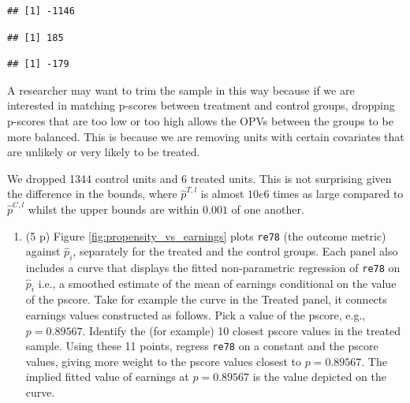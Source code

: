 \documentclass[
]{article}
\newenvironment{Shaded}{\begin{snugshade}}{\end{snugshade}}
\newcommand{\DecValTok}[1]{\textcolor[rgb]{0.00,0.00,0.81}{#1}}
\newcommand{\FunctionTok}[1]{\textcolor[rgb]{0.13,0.29,0.53}{\textbf{#1}}}
\newcommand{\NormalTok}[1]{#1}
\newcommand{\SpecialCharTok}[1]{\textcolor[rgb]{0.81,0.36,0.00}{\textbf{#1}}}
\providecommand{\tightlist}{%
  \setlength{\itemsep}{0pt}\setlength{\parskip}{0pt}}
\begin{document}
\begin{verbatim}
## [1] -1146
\end{verbatim}

\begin{Shaded}
\end{Shaded}

\begin{verbatim}
## [1] 185
\end{verbatim}

\begin{Shaded}
\end{Shaded}

\begin{verbatim}
## [1] -179
\end{verbatim}

A researcher may want to trim the sample in this way because if we are
interested in matching p-scores between treatment and control groups,
dropping p-scores that are too low or too high allows the OPVs between
the groups to be more balanced. This is because we are removing units
with certain covariates that are unlikely or very likely to be treated.

We dropped 1344 control units and 6 treated units. This is not
surprising given the difference in the bounds, where \(\hat{p}^{T,l}\)
is almost \(10e6\) times as large compared to \(\hat{p}^{C,l}\) whilst
the upper bounds are within \(0.001\) of one another.

\begin{enumerate}
\def\labelenumi{\arabic{enumi}.}
\setcounter{enumi}{1}
\tightlist
\item
  (5 p) Figure \ref{fig:propensity_vs_earnings} plots \texttt{re78} (the
  outcome metric) against \(\widehat{p}_{i}\), separately for the
  treated and the control groups. Each panel also includes a curve that
  displays the fitted non-parametric regression of \texttt{re78} on
  \(\widehat{p}_{i}\) i.e., a smoothed estimate of the mean of earnings
  conditional on the value of the pscore. Take for example the curve in
  the Treated panel, it connects earnings values constructed as follows.
  Pick a value of the pscore, e.g., \(p=0.89567\). Identify the (for
  example) 10 closest pscore values in the treated sample. Using these
  11 points, regress \texttt{re78} on a constant and the pscore values,
  giving more weight to the pscore values closest to \(p=0.89567\). The
  implied fitted value of earnings at \(p=0.89567\) is the value
  depicted on the curve.
\end{enumerate}
\end{document}
